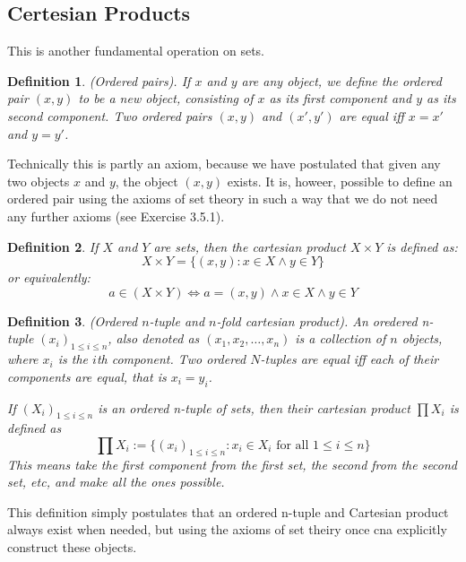 \documentclass{article}
\newtheorem{definition}{Definition}[subsection]
\begin{document}
\subsection{Certesian Products}

This is another fundamental operation on sets. 

\begin{definition}
	(Ordered pairs). If $x$ and $y$ are any object, we define the 
	ordered pair $(x,y)$ to be a new object, consisting of $x$ 
	as its first component and $y$ as its second component. Two 
	ordered pairs $(x,y)$ and $(x',y')$ are equal iff $x=x'$ and $y=y'$.
\end{definition}

Technically this is partly an axiom, because we have postulated that given any 
two objects $x$ and $y$, the object $(x,y)$ exists. It is, howeer, 
possible to define an ordered pair using the axioms of set theory in such 
a way that we do not need any further axioms (see Exercise 3.5.1). 

\begin{definition}
	If $X$ and $Y$ are sets, then the cartesian product
	$X \times Y$ is defined as: 
	$$
	X \times Y = \{(x,y) : x \in X \land y \in Y\}
	$$
	or equivalently:
	$$
	a \in (X \times Y) \iff a = (x,y) \land x\in X \land  y \in Y
	$$
\end{definition}

\begin{definition}
	(Ordered $n$-tuple and $n$-fold cartesian product). An 
	oredered n-tuple $(x_i)_{1 \leq i \leq n}$, also 
	denoted as $(x_1, x_2, \dots, x_n)$ is a collection of 
	$n$ objects, where $x_i$ is the $i$th component. Two 
	ordered $N$-tuples are equal iff each of their components
	are equal, that is $x_i = y_i$. 

	If $(X_i)_{1 \leq i \leq n}$
	is an ordered n-tuple of sets, then their cartesian 
	product $\prod X_i$ is defined as
	$$
	\prod X_i := \{(x_i)_{1 \leq i \leq n} : x_i \in X_i \text{ for all } 
	1 \leq i \leq n\}
	$$
	This means take the first component from the first set, the
	second from the second set, etc, and make all the ones possible.
\end{definition}

This definition simply postulates that an ordered n-tuple and Cartesian
product always exist when needed, but using the 
axioms of set theiry once cna explicitly construct these objects.
\end{document}
